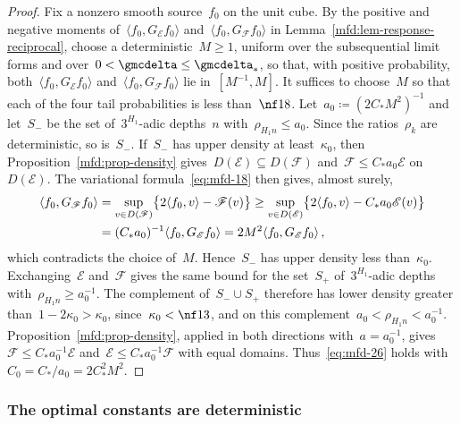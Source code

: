 \documentclass[11pt]{amsart}
\begin{document}
\begin{proof}
Fix a nonzero smooth source~$f_0$ on the unit cube. By the positive and negative moments of~$\langle f_0,G_{\mathscr E}f_0\rangle$ and~$\langle f_0,G_{\mathscr F}f_0\rangle$ in Lemma~\ref{mfd:lem-response-reciprocal}, choose a deterministic~$M\geq1$, uniform over the subsequential limit forms and over~$0<\gmcdelta\leq\gmcdelta_*$, so that, with positive probability, both~$\langle f_0,G_{\mathscr E}f_0\rangle$ and~$\langle f_0,G_{\mathscr F}f_0\rangle$ lie in~$[M^{-1},M]$. It suffices to choose~$M$ so that each of the four tail probabilities is less than~$\nf18$. Let~$a_0\coloneqq(2C_*M^2)^{-1}$ and let~$S_-$ be the set of~$3^{H_1}$-adic depths~$n$ with~$\rho_{H_1n}\leq a_0$. Since the ratios~$\rho_k$ are deterministic, so is~$S_-$. If~$S_-$ has upper density at least~$\kappa_0$, then Proposition~\ref{mfd:prop-density} gives~$D(\mathscr E)\subseteq D(\mathscr F)$ and~$\mathscr F\leq C_*a_0\mathscr E$ on~$D(\mathscr E)$. The variational formula~\eqref{eq:mfd-18} then gives, almost surely,
\begin{align*}
	\langle f_0,G_{\mathscr F}f_0\rangle
	&=\sup_{v\in D(\mathscr F)}\bigl\{2\langle f_0,v\rangle-\mathscr F(v)\bigr\}
	\geq\sup_{v\in D(\mathscr E)}\bigl\{2\langle f_0,v\rangle-C_*a_0\mathscr E(v)\bigr\}
	\notag \\ &
	=(C_*a_0)^{-1}\langle f_0,G_{\mathscr E}f_0\rangle=2M^2\langle f_0,G_{\mathscr E}f_0\rangle\,,
\end{align*}
which contradicts the choice of~$M$. Hence~$S_-$ has upper density less than~$\kappa_0$. Exchanging~$\mathscr E$ and~$\mathscr F$ gives the same bound for the set~$S_+$ of~$3^{H_1}$-adic depths with~$\rho_{H_1n}\geq a_0^{-1}$. The complement of~$S_-\cup S_+$ therefore has lower density greater than~$1-2\kappa_0>\kappa_0$, since~$\kappa_0<\nf13$, and on this complement~$a_0<\rho_{H_1n}<a_0^{-1}$. Proposition~\ref{mfd:prop-density}, applied in both directions with~$a=a_0^{-1}$, gives~$\mathscr F\leq C_*a_0^{-1}\mathscr E$ and~$\mathscr E\leq C_*a_0^{-1}\mathscr F$ with equal domains. Thus~\eqref{eq:mfd-26} holds with~$C_0=C_*/a_0=2C_*^2M^2$.
\end{proof}

\subsubsection{The optimal constants are deterministic}
\end{document}
